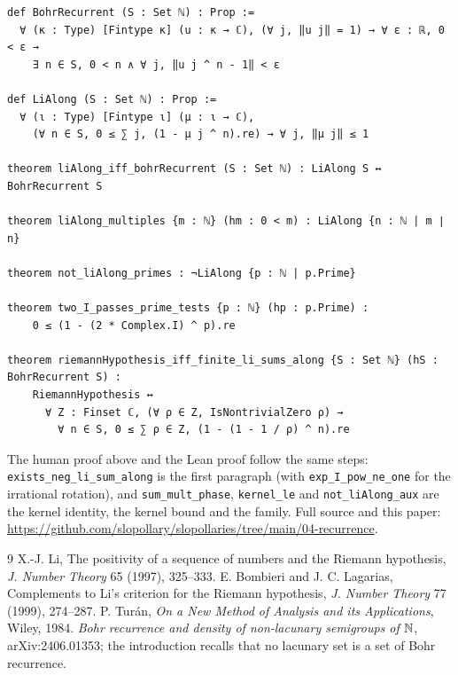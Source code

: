 \documentclass[11pt,a4paper]{article}
\theoremstyle{definition}\newtheorem*{definition}{Definition}
\theoremstyle{remark}\newtheorem*{remark}{Remark}
\begin{document}
\begin{Verbatim}[frame=single,rulecolor=\color{gray!50},fontsize=\small]
def BohrRecurrent (S : Set ℕ) : Prop :=
  ∀ (κ : Type) [Fintype κ] (u : κ → ℂ), (∀ j, ‖u j‖ = 1) → ∀ ε : ℝ, 0 < ε →
    ∃ n ∈ S, 0 < n ∧ ∀ j, ‖u j ^ n - 1‖ < ε

def LiAlong (S : Set ℕ) : Prop :=
  ∀ (ι : Type) [Fintype ι] (μ : ι → ℂ),
    (∀ n ∈ S, 0 ≤ ∑ j, (1 - μ j ^ n).re) → ∀ j, ‖μ j‖ ≤ 1

theorem liAlong_iff_bohrRecurrent (S : Set ℕ) : LiAlong S ↔ BohrRecurrent S

theorem liAlong_multiples {m : ℕ} (hm : 0 < m) : LiAlong {n : ℕ | m ∣ n}

theorem not_liAlong_primes : ¬LiAlong {p : ℕ | p.Prime}

theorem two_I_passes_prime_tests {p : ℕ} (hp : p.Prime) :
    0 ≤ (1 - (2 * Complex.I) ^ p).re

theorem riemannHypothesis_iff_finite_li_sums_along {S : Set ℕ} (hS : BohrRecurrent S) :
    RiemannHypothesis ↔
      ∀ Z : Finset ℂ, (∀ ρ ∈ Z, IsNontrivialZero ρ) →
        ∀ n ∈ S, 0 ≤ ∑ ρ ∈ Z, (1 - (1 - 1 / ρ) ^ n).re
\end{Verbatim}
The human proof above and the Lean proof follow the same steps: \texttt{exists\_neg\_li\_sum\_along}
is the first paragraph (with \texttt{exp\_I\_pow\_ne\_one} for the irrational rotation), and
\texttt{sum\_mult\_phase}, \texttt{kernel\_le} and \texttt{not\_liAlong\_aux} are the kernel
identity, the kernel bound and the family. Full source and this paper:
\url{https://github.com/slopollary/slopollaries/tree/main/04-recurrence}.

\begin{thebibliography}{9}\small
{} X.-J. Li, The positivity of a sequence of numbers and the Riemann hypothesis,
\emph{J. Number Theory} 65 (1997), 325--333.
 E. Bombieri and J. C. Lagarias, Complements to Li's criterion for the Riemann
hypothesis, \emph{J. Number Theory} 77 (1999), 274--287.
 P. Tur\'an, \emph{On a New Method of Analysis and its Applications}, Wiley, 1984.
 \emph{Bohr recurrence and density of non-lacunary semigroups of $\mathbb{N}$},
arXiv:2406.01353; the introduction recalls that no lacunary set is a set of Bohr recurrence.
\end{thebibliography}
\end{document}
